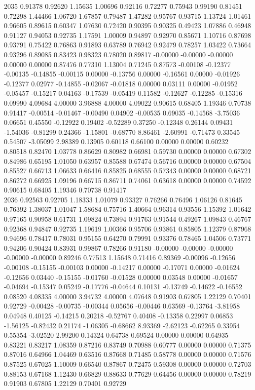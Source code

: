 {2035 0.91378 0.92620 1.15635 1.00696 0.92116 0.72277 0.75943 0.99190 0.81451 0.72298 1.44466 1.06720 1.67857 0.79487 1.47282 0.95767 0.93715 1.13724 1.01461 0.96605 0.89615 0.60347 1.07630 0.72420 0.90395 0.90325 0.49423 1.07886 0.46948 0.91127 0.94053 0.92735 1.17591 1.00009 0.94897 0.92970 0.85671 1.10716 0.87698 0.93791 0.75422 0.76863 0.91893 0.63789 0.76942 0.92479 0.78257 1.03422 0.73664 0.93296 0.89085 0.83423 0.98323 0.78020 0.89817 -0.00000 -0.00000 -0.00000 0.00000 0.00000 0.87476 0.77310 1.13004 0.71245 0.87573 -0.00108 -0.12377 -0.00135 -0.14855 -0.00115 0.00000 -0.13756 0.00000 -0.16561 0.00000 -0.01926 -0.12377 0.02977 -0.14855 -0.02067 -0.01818 0.00000 0.03111 0.00000 -0.01952 -0.05457 -0.15217 0.04163 -0.17539 -0.05419 0.11582 -0.12627 -0.12285 -0.15316 0.09990 4.09684 4.00000 3.96888 4.00000 4.09022 0.90615 0.68405 1.19346 0.70738 0.91417 -0.00514 -0.01467 -0.00490 0.04902 -0.00535 0.69035 -0.14568 -3.75036 0.06651 0.45550 -0.12922 0.19402 -0.52289 0.37250 -0.12348 0.26144 0.09431 -1.54036 -0.81299 0.24366 -1.15801 -0.68770 8.86461 -2.60991 -0.71473 0.33545 0.54507 -3.05099 2.98389 0.13905 0.60118 0.66100 0.00000 0.00000 0.60232 0.80518 0.82470 1.03778 0.86629 0.80982 0.66981 0.59730 0.00000 0.00000 0.67302 0.84986 0.65195 1.01050 0.63957 0.85588 0.67474 0.56716 0.00000 0.00000 0.67504 0.85527 0.66713 1.06633 0.66416 0.85825 0.68555 0.57343 0.00000 0.00000 0.68721 0.86272 0.66925 1.09196 0.66715 0.86711 0.74061 0.63618 0.00000 0.00000 0.74592 0.90615 0.68405 1.19346 0.70738 0.91417 \\
2036 0.92563 0.92705 1.18333 1.01079 0.93327 0.76266 0.76496 1.06126 0.81645 0.76392 1.38037 1.01047 1.58684 0.75716 1.40664 0.96314 0.93556 1.15392 1.01642 0.97165 0.90958 0.61731 1.09824 0.73894 0.91763 0.91544 0.49267 1.09843 0.46767 0.92368 0.94847 0.92735 1.19619 1.00366 0.95706 0.93861 0.85805 1.12379 0.87968 0.94696 0.78417 0.78031 0.95155 0.64270 0.79991 0.93376 0.78465 1.04506 0.73771 0.94206 0.90424 0.83931 0.99867 0.78266 0.91180 -0.00000 -0.00000 -0.00000 -0.00000 -0.00000 0.89246 0.77513 1.15648 0.71416 0.89369 -0.00096 -0.12656 -0.00108 -0.15155 -0.00103 0.00000 -0.14217 0.00000 -0.17071 0.00000 -0.01624 -0.12656 0.03440 -0.15155 -0.01760 -0.01528 0.00000 0.03548 0.00000 -0.01657 -0.04694 -0.15347 0.05249 -0.17776 -0.04644 0.10131 -0.13749 -0.14622 -0.16552 0.08520 4.08335 4.00000 3.94732 4.00000 4.07648 0.91903 0.67805 1.22129 0.70401 0.92729 -0.00428 -0.00735 -0.00344 0.05656 -0.00446 0.63569 -0.13764 -3.81958 0.04948 0.40125 -0.14215 0.20218 -0.52767 0.40408 -0.13358 0.22997 0.06853 -1.56125 -0.82432 0.21174 -1.06305 -0.68662 8.93369 -2.62123 -0.62265 0.33954 0.55354 -3.02520 2.99200 0.14324 0.64738 0.69524 0.00000 0.00000 0.64935 0.83221 0.83217 1.08359 0.87216 0.83749 0.70988 0.60777 0.00000 0.00000 0.71375 0.87016 0.64966 1.04469 0.63516 0.87668 0.71485 0.58778 0.00000 0.00000 0.71576 0.87525 0.67025 1.10009 0.66540 0.87867 0.72475 0.59308 0.00000 0.00000 0.72703 0.88153 0.67168 1.12430 0.66829 0.88633 0.77629 0.64456 0.00000 0.00000 0.78219 0.91903 0.67805 1.22129 0.70401 0.92729 \\
}
